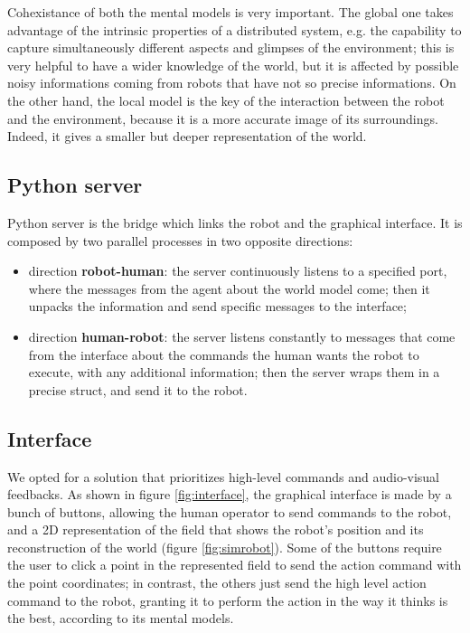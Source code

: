 \documentclass[a4paper, onecolumn, 12pt]{article}
\begin{document}
Cohexistance of both the mental models is very important.
The global one takes advantage of the intrinsic properties of a 
distributed system, e.g. the capability to capture simultaneously different
aspects and glimpses of the environment; this is very helpful to have a wider
knowledge of the world, but it is affected by possible noisy informations coming 
from robots that have not so precise informations.
On the other hand, the local model is the key of the interaction between the robot and
the environment, because it is a more accurate image of its surroundings.
Indeed, it gives a smaller but deeper representation of the world.

\subsection{Python server}

Python server is the bridge which links the robot and the graphical 
interface. It is composed by two parallel processes in two opposite directions:
\begin{itemize}
    \item direction \textbf{robot-human}: the server continuously listens to a specified port, where
    the messages from the agent about the world model come; then it unpacks the information and send 
    specific messages to the interface;
    \item direction \textbf{human-robot}: the server listens constantly to messages that come from
    the interface about the commands the human wants the robot to execute, with any additional 
    information; then the server wraps them in a precise struct, and send it to the robot. 
     
\end{itemize} 

\subsection{Interface}
\label{subsec:interface}
We opted for a solution that prioritizes high-level commands and audio-visual
feedbacks. As shown in figure \ref{fig:interface}, the graphical interface is made by a bunch of buttons,
allowing the human operator to send commands to the robot, and a 2D representation of the
field that shows the robot's position and its reconstruction of the world (figure \ref{fig:simrobot}).
Some of the buttons require the user to click a point in the represented field to
send the action command with the point coordinates; in contrast, the others just send
the high level action command to the robot, granting it to perform
the action in the way it thinks is the best, according to its mental models.
\end{document}
